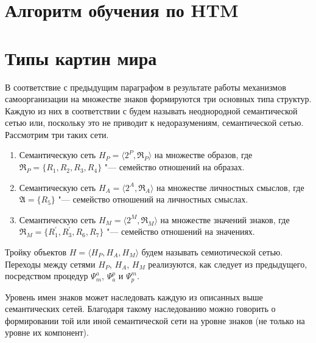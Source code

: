 \appendix
\chapter{Алгоритм обучения по HTM} \label{AppendixA}

\chapter{Типы картин мира} \label{AppendixC}

В соответствие с предыдущим параграфом в результате работы механизмов самоорганизации на множестве знаков формируются три основных типа структур. Каждую из них в соответствии с \cite{Osipov1990} будем называть неоднородной семантической сетью или, поскольку это не приводит к недоразумениям, семантической сетью. Рассмотрим три таких сети.
\begin{enumerate}
	\renewcommand\labelenumi{\theenumi.}
	\item Семантическую сеть $H_P=\langle 2^P,\mathfrak R_P\rangle$ на множестве образов, где $\mathfrak R_P=\{R_1,R_2,R_3,R_4\}$ "--- семейство отношений на образах.
	\item Семантическую сеть $H_A=\langle 2^A,\mathfrak R_A\rangle$ на множестве личностных смыслов, где $\mathfrak A=\{R_5\}$ "--- семейство отношений на личностных смыслах.
	\item Семантическую сеть $H_M=\langle 2^M,\mathfrak R_M\rangle$ на множестве значений знаков, где $\mathfrak R_M=\{R_1^\prime,R_3^\prime,R_6,R_7\}$ "--- семейство отношений на значениях.
\end{enumerate}

Тройку объектов $H=\langle H_P,H_A,H_M\rangle$ будем называть семиотической сетью. Переходы между сетями $H_P$, $H_A$, $H_M$ реализуются, как следует из предыдущего, посредством процедур $\Psi_m^a$, $\Psi_a^p$ и $\Psi_p^m$.

Уровень имен знаков может наследовать каждую из описанных выше семантических сетей. Благодаря такому наследованию можно говорить о формировании той или иной семантической сети на уровне знаков (не только на уровне их компонент).

